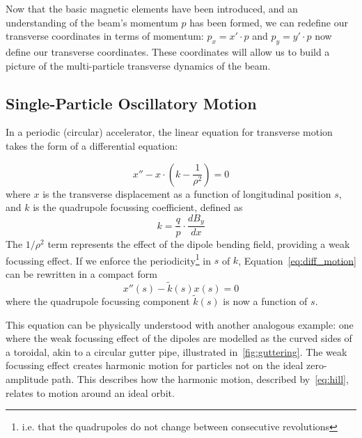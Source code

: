 \documentclass[11pt]{report}
\begin{document}
Now that the basic magnetic elements have been introduced, and an understanding of the beam's momentum $p$ has been formed, we can redefine our transverse coordinates in terms of momentum: $p_x=x'\cdot p$ and $p_y=y'\cdot p$ now define our transverse coordinates. These coordinates will allow us to build a picture of the multi-particle transverse dynamics of the beam.

\subsection{Single-Particle Oscillatory Motion}

In a periodic (circular) accelerator, the linear equation for transverse motion takes the form of a differential equation:

\begin{equation}
  x''-x\cdot\left(k-\frac{1}{\rho^2}\right)=0
  \label{eq:diff_motion}
\end{equation} 
where $x$ is the transverse displacement as a function of longitudinal position $s$, and $k$ is the quadrupole focussing coefficient, defined as
\begin{equation}
  k=\frac{q}{p}\cdot\frac{dB_y}{dx}
  \label{eq:quadrupole}
\end{equation}
The $1/\rho^2$ term represents the effect of the dipole bending field, providing a weak focussing effect. If we enforce the periodicity\footnote{i.e. that the quadrupoles do not change between consecutive revolutions} in $s$ of $k$, Equation~\ref{eq:diff_motion} can be rewritten in a compact form
\begin{equation}
  x''(s)-\tilde{k}(s)x(s)=0
  \label{eq:hill}
\end{equation} where the quadrupole focussing component $\tilde{k}(s)$ is now a function of $s$. 

This equation can be physically understood with another analogous example: one where the weak focussing effect of the dipoles are modelled as the curved sides of a toroidal, akin to a circular gutter pipe, illustrated in~\ref{fig:guttering}. The weak focussing effect creates harmonic motion for particles not on the ideal zero-amplitude path. This describes how the harmonic motion, described by~\autoref{eq:hill}, relates to motion around an ideal orbit.
\end{document}
